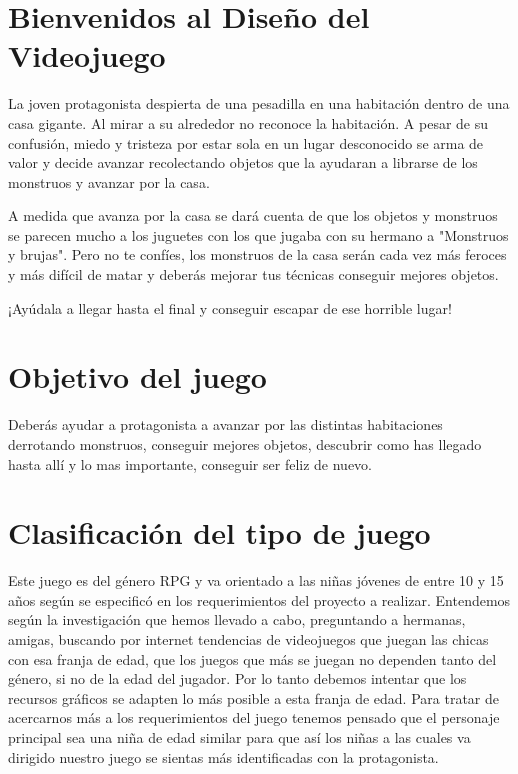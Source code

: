 \section{Bienvenidos al Diseño del Videojuego}


La joven protagonista despierta de una pesadilla en una habitación dentro de una casa gigante. Al mirar a su alrededor no reconoce la habitación. A pesar de su confusión, miedo y tristeza por estar sola en un lugar desconocido se arma de valor y decide avanzar recolectando objetos que la ayudaran a librarse de los monstruos y avanzar por la casa.\newline
\newline

A medida que avanza por la casa se dará cuenta de que los objetos y monstruos se parecen mucho a los juguetes con los que jugaba con su hermano a "Monstruos y brujas". Pero no te confíes, los monstruos de la casa serán cada vez más feroces y más difícil de matar y deberás mejorar tus técnicas conseguir mejores objetos.\newline
\newline

\centerline{¡Ayúdala a llegar hasta el final y conseguir escapar de ese horrible lugar!}


\section{Objetivo del juego}

Deberás ayudar a protagonista a avanzar por las distintas habitaciones derrotando monstruos, conseguir mejores objetos, descubrir como has llegado hasta allí y lo mas importante, conseguir ser feliz de nuevo.

\section{Clasificación del tipo de juego}

Este juego es del género RPG y va orientado a las niñas jóvenes de entre 10 y 15 años según se especificó en los requerimientos del proyecto a realizar. Entendemos según la investigación que hemos llevado a cabo, preguntando a hermanas, amigas, buscando por internet tendencias de videojuegos que juegan las chicas con esa franja de edad, que los juegos que más se juegan no dependen tanto del género, si no de la edad del jugador. Por lo tanto debemos intentar que los recursos gráficos se adapten lo más posible a esta franja de edad. Para tratar de acercarnos más a los requerimientos del juego tenemos pensado que el personaje principal sea una niña de edad similar para que así los niñas a las cuales va dirigido nuestro juego se sientas más identificadas con la protagonista.


